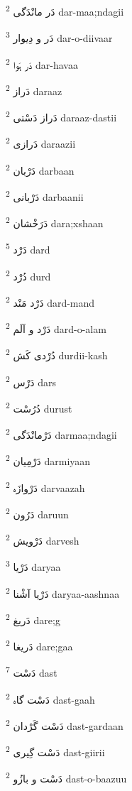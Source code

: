 \documentclass[12pt]{article}
\begin{document}
\begin{multicols}{5}
{\ur دَر مانْدَگی}   \textsuperscript{2} dar-maa;ndagii

{\ur دَر و دِیوار}   \textsuperscript{3} dar-o-diivaar

{\ur دَر ہَوا}   \textsuperscript{2} dar-havaa

{\ur دَراز}   \textsuperscript{2} daraaz

{\ur دَراز دَسْتی}   \textsuperscript{2} daraaz-dastii

{\ur دَرازی}   \textsuperscript{2} daraazii

{\ur دَرْبان}   \textsuperscript{2} darbaan

{\ur دَرْبانی}   \textsuperscript{2} darbaanii

{\ur دَرَخْشان}   \textsuperscript{2} dara;xshaan

{\ur دَرْد}   \textsuperscript{5} dard

{\ur دُرْد}   \textsuperscript{2} durd

{\ur دَرْد مَنْد}   \textsuperscript{2} dard-mand

{\ur دَرْد و اَلَم}   \textsuperscript{2} dard-o-alam

{\ur دُرْدی کَش}   \textsuperscript{2} durdii-kash

{\ur دَرْس}   \textsuperscript{2} dars

{\ur دُرُسْت}   \textsuperscript{2} durust

{\ur دَرْمانْدَگی}   \textsuperscript{2} darmaa;ndagii

{\ur دَرْمِیان}   \textsuperscript{2} darmiyaan

{\ur دَرْوازَہ}   \textsuperscript{2} darvaazah

{\ur دَرُون}   \textsuperscript{2} daruun

{\ur دَرْویش}   \textsuperscript{2} darvesh

{\ur دَرْیا}   \textsuperscript{3} daryaa

{\ur دَرْیا آشْنا}   \textsuperscript{2} daryaa-aashnaa

{\ur دَریغ}   \textsuperscript{2} dare;g

{\ur دَریغا}   \textsuperscript{2} dare;gaa

{\ur دَسْت}   \textsuperscript{7} dast

{\ur دَسْت گاہ}   \textsuperscript{2} dast-gaah

{\ur دَسْت گَرْدان}   \textsuperscript{2} dast-gardaan

{\ur دَسْت گِیری}   \textsuperscript{2} dast-giirii

{\ur دَسْت و بازُو}   \textsuperscript{2} dast-o-baazuu


\end{multicols}
\end{document}
